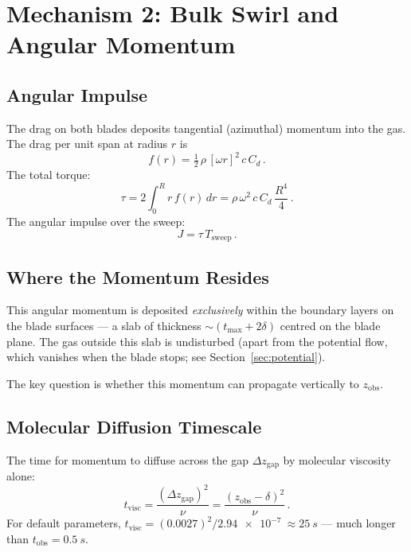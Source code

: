 \documentclass[11pt,a4paper]{article}
\begin{document}
\section{Mechanism 2: Bulk Swirl and Angular Momentum}
\label{sec:swirl}

\subsection{Angular Impulse}

The drag on both blades deposits tangential (azimuthal) momentum into
the gas. The drag per unit span at radius $r$ is
\begin{equation}
  f(r) = \tfrac{1}{2}\,\rho\,[\omega r]^2\,c\,C_d\,.
\end{equation}
The total torque:
\begin{equation}
  \tau = 2 \int_0^R r\, f(r)\, dr
      = \rho\,\omega^2\,c\,C_d\,\frac{R^4}{4}\,.
  \label{eq:torque}
\end{equation}
The angular impulse over the sweep:
\begin{equation}
  J = \tau\, T_\mathrm{sweep}\,.
  \label{eq:J}
\end{equation}

\subsection{Where the Momentum Resides}

This angular momentum is deposited \emph{exclusively} within the
boundary layers on the blade surfaces --- a slab of thickness
$\sim(t_\mathrm{max} + 2\delta)$ centred on the blade plane. The gas
outside this slab is undisturbed (apart from the potential flow, which
vanishes when the blade stops; see Section~\ref{sec:potential}).

The key question is whether this momentum can propagate vertically to
$z_\mathrm{obs}$.

\subsection{Molecular Diffusion Timescale}

The time for momentum to diffuse across the gap
$\Delta z_\mathrm{gap}$ by molecular viscosity alone:
\begin{equation}
  t_\mathrm{visc}
    = \frac{(\Delta z_\mathrm{gap})^2}{\nu}
    = \frac{(z_\mathrm{obs} - \delta)^2}{\nu}\,.
  \label{eq:tvisc}
\end{equation}
For default parameters,
$t_\mathrm{visc} = (0.0027)^2 / \SI{2.94e-7}{} \approx \SI{25}{s}$
--- much longer than $t_\mathrm{obs} = \SI{0.5}{s}$.
\end{document}
